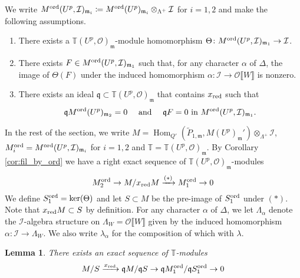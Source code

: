 \documentclass[leqno]{amsart}
\newtheorem{lem}[thm]{Lemma}
\theoremstyle{definition}
\theoremstyle{remark}
\newcommand{\oo}{\mathcal{O}}
\DeclareMathOperator{\Hom}{Hom}
\newcommand{\fm}{\mathfrak{m}}
\newcommand{\fq}{\mathfrak{q}}
\newcommand{\xx}{x_\textnormal{red}}
\newcommand{\TT}{\mathbb{T}} %
\newcommand{\I}{\mathcal{I}} %
\newcommand{\ord}{\textnormal{ord}} %
\begin{document}
We write
$M^{\ord}(U^p,\I)_{\fm_i}\coloneqq
M^{\ord}(U^p)_{\fm_i}\otimes_{\Lambda^+}\I$ for $i=1,2$
and make the following assumptions.
\begin{enumerate}[label=(C\arabic*)]
\item There exists a $\TT(U^p,\oo)_\fm$-module 
homomorphism
$\Theta\colon M^{\ord}(U^p,\I)_{\fm_1}\to \I$.
\label{cond:C1}
\item There exists $F\in M^{\ord}(U^p,\I)_{\fm_1}$
such that,
for any character $\alpha$ of $\Delta$,
the image of $\Theta(F)$ under the induced homomorphism
$\alpha\colon\I\to\oo\llbracket W\rrbracket$ is nonzero.
\label{cond:C3}
\item There exists an ideal 
$\fq\subset \TT(U^p,\oo)_{\fm}$
that contains $\xx$ such that
\[
    \fq M^{\ord}(U^p)_{\fm_2}=0\quad
    \text{ and }\quad
    \fq F=0 \text{ in } M^{\ord}(U^p,\I)_{\fm_1}.
\]
\label{cond:C2}

\end{enumerate}

In the rest of the section, we write
$M=\Hom_{Q'}(\tilde{P}_{1,\fm},M(U^p)_{\fm}')
\otimes_{\Lambda^+}\I$,
$M_i^{\ord}=M^{\ord}(U^p,\I)_{\fm_i}$ for $i=1,2$ and
$\TT=\TT(U^p,\oo)_{\fm}$.
By Corollary \ref{cor:fil_by_ord}
we have a right exact sequence of $\TT(U^p,\oo)_\fm$-modules
\begin{equation}\label{eq:chain_coh}
    M_2^{\ord}\to M/\xx M\xrightarrow{(*)} M_1^{\ord}\to 0
\end{equation}
We define $S_1^{\ord}=\ker(\Theta)$ and let $S\subset M$
be the pre-image of $S_1^{\ord}$ under $(*)$.
Note that $\xx M\subset S$ by definition.
For any character $\alpha$ of $\Delta$,
we let $\Lambda_\alpha$ denote the $\I$-algebra structure
on $\Lambda_W=\oo\llbracket W\rrbracket$ given by 
the induced homomorphism $\alpha\colon\I\to \Lambda_W$.
We also write $\lambda_\alpha$
for the composition of which with $\lambda$.


\begin{lem}\label{lem:right_exact}
There exists an exact sequence
of $\TT$-modules
\begin{equation}\label{eq:fund}
	M/S\xrightarrow{\xx} \fq M/\fq S\to 
	\fq M_1^\ord/\fq S_1^\ord \to 0
\end{equation}
\end{lem}
\end{document}
